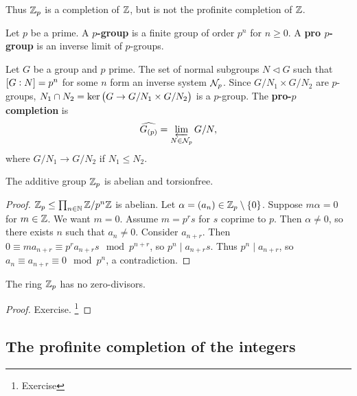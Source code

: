 Thus $ \mathbb{Z}_p $ is a completion of $ \mathbb{Z} $, but is not the profinite completion of $ \mathbb{Z} $.

\begin{definition}
Let $ p $ be a prime. A \textbf{$ p $-group} is a finite group of order $ p^n $ for $ n \ge 0 $. A \textbf{pro $ p $-group} is an inverse limit of $ p $-groups.
\end{definition}

\begin{definition}
Let $ G $ be a group and $ p $ prime. The set of normal subgroups $ N \triangleleft G $ such that $ \sbr{G : N} = p^n $ for some $ n $ form an inverse system $ \mathcal{N}_p $. Since $ G / N_1 \times G / N_2 $ are $ p $-groups, $ N_1 \cap N_2 = \ker \br{G \to G / N_1 \times G / N_2} $ is a $ p $-group. The \textbf{pro-$ p $ completion} is
$$ \widehat{G_{\br{p}}} = \varprojlim_{N \in \NNN_p} G / N, $$
where $ G / N_1 \to G / N_2 $ if $ N_1 \le N_2 $.
\end{definition}

\begin{proposition}
The additive group $ \mathbb{Z}_p $ is abelian and torsionfree.
\end{proposition}

\begin{proof}
$ \mathbb{Z}_p \le \prod_{n \in \mathbb{N}} \mathbb{Z} / p^n\mathbb{Z} $ is abelian. Let $ \alpha = \br{a_n} \in \ZZ_p \setminus \cbr{0} $. Suppose $ m\alpha = 0 $ for $ m \in \mathbb{Z} $. We want $ m = 0 $. Assume $ m = p^rs $ for $ s $ coprime to $ p $. Then $ \alpha \ne 0 $, so there exists $ n $ such that $ a_n \ne 0 $. Consider $ a_{n + r} $. Then $ 0 \equiv ma_{n + r} \equiv p^ra_{n + r}s \mod p^{n + r} $, so $ p^n \mid a_{n + r}s $. Thus $ p^n \mid a_{n + r} $, so $ a_n \equiv a_{n + r} \equiv 0 \mod p^n $, a contradiction.
\end{proof}

\pagebreak

\begin{proposition}
The ring $ \mathbb{Z}_p $ has no zero-divisors.
\end{proposition}

\begin{proof}
Exercise. \footnote{Exercise}
\end{proof}

\subsection{The profinite completion of the integers}

